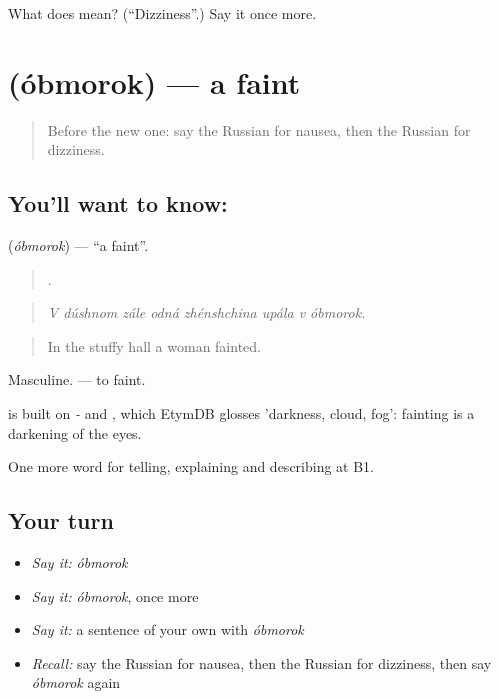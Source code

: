 \begin{tcolorbox}[breakable,colback=teal!4,colframe=teal!35!black,title={Before you move on}]
What does  mean? (\textquotedblleft{}Dizziness\textquotedblright{}.) Say it once more.
\end{tcolorbox}
\section[\texorpdfstring{\ru{обморок} (óbmorok)}{обморок (óbmorok)}]{ (óbmorok) — a faint}

\label{lesson:RU-C485-obmorok}



\begin{quote}
Before the new one: say the Russian for nausea, then the Russian for dizziness.
\end{quote}

\subsection*{You'll want to know: }
\textbf{} (\emph{óbmorok}) — \textquotedblleft{}a faint\textquotedblright{}.

\begin{quote}
       .
\end{quote}

\begin{quote}
\emph{V dúshnom zále odná zhénshchina upála v óbmorok.}
\end{quote}

\begin{quote}
In the stuffy hall a woman fainted.
\end{quote}

Masculine. \emph{  } — to faint.

\begin{cousinweb}
\emph{} is built on \emph{-} and \emph{}, which EtymDB glosses 'darkness, cloud, fog': fainting is a darkening of the eyes.
\end{cousinweb}

\begin{grammarlens}[title={What you've built}]
One more word for telling, explaining and describing at B1.
\end{grammarlens}

\subsection*{Your turn}
\begin{itemize}
\raggedright
  \item \emph{Say it:} \emph{óbmorok}
  \item \emph{Say it:} \emph{óbmorok}, once more
  \item \emph{Say it:} a sentence of your own with \emph{óbmorok}
  \item \emph{Recall:} say the Russian for nausea, then the Russian for dizziness, then say \emph{óbmorok} again
\end{itemize}

